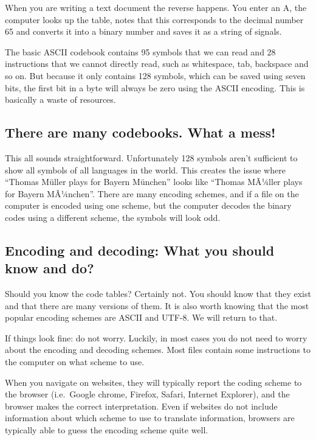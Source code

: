 \documentclass[
]{book}
\begin{document}
When you are writing a text document the reverse happens. You enter an A, the computer looks up the table, notes that this corresponds to the decimal number 65 and converts it into a binary number and saves it as a string of signals.

The basic ASCII codebook contains 95 symbols that we can read and 28 instructions that we cannot directly read, such as whitespace, tab, backspace and so on. But because it only contains 128 symbols, which can be saved using seven bits, the first bit in a byte will always be zero using the ASCII encoding. This is basically a waste of resources.

\hypertarget{there-are-many-codebooks.-what-a-mess}{%
\subsection*{There are many codebooks. What a mess!}\label{there-are-many-codebooks.-what-a-mess}}

This all sounds straightforward. Unfortunately 128 symbols aren't sufficient to show all symbols of all languages in the world. This creates the issue where ``Thomas Müller plays for Bayern München'' looks like ``Thomas MÃ¼ller plays for Bayern MÃ¼nchen''. There are many encoding schemes, and if a file on the computer is encoded using one scheme, but the computer decodes the binary codes using a different scheme, the symbols will look odd.

\hypertarget{encoding-and-decoding-what-you-should-know-and-do}{%
\subsection*{Encoding and decoding: What you should know and do?}\label{encoding-and-decoding-what-you-should-know-and-do}}

Should you know the code tables? Certainly not. You should know that they exist and that there are many versions of them. It is also worth knowing that the most popular encoding schemes are ASCII and UTF-8. We will return to that.

If things look fine: do not worry. Luckily, in most cases you do not need to worry about the encoding and decoding schemes. Most files contain some instructions to the computer on what scheme to use.

When you navigate on websites, they will typically report the coding scheme to the browser (i.e.~Google chrome, Firefox, Safari, Internet Explorer), and the browser makes the correct interpretation. Even if websites do not include information about which scheme to use to translate information, browsers are typically able to guess the encoding scheme quite well.
\end{document}
